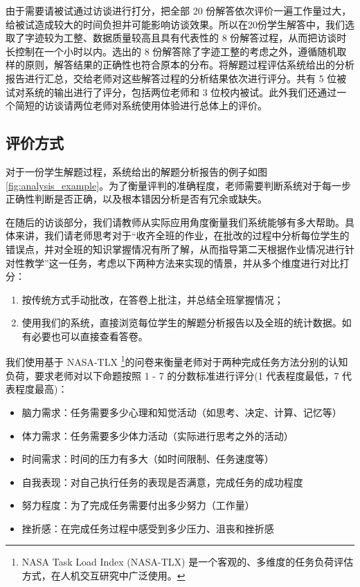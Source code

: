 由于需要请被试通过访谈进行打分，把全部 20 份解答依次评价一遍工作量过大，给被试造成较大的时间负担并可能影响访谈效果。所以在20份学生解答中，我们选取了字迹较为工整、数据质量较高且具有代表性的 8 份解答过程，从而把访谈时长控制在一个小时以内。选出的 8 份解答除了字迹工整的考虑之外，遵循随机取样的原则，解答结果的正确性也符合原本的分布。将解题过程评估系统给出的分析报告进行汇总，交给老师对这些解答过程的分析结果依次进行评分。共有 5 位被试对系统的输出进行了评分，包括两位老师和 3 位校内被试。此外我们还通过一个简短的访谈请两位老师对系统使用体验进行总体上的评价。

\subsection{评价方式}

对于一份学生解题过程，系统给出的解题分析报告的例子如图\ref{fig:analysis_example}。为了衡量评判的准确程度，老师需要判断系统对于每一步正确性判断是否正确，以及根本错因分析是否有冗余或缺失。

在随后的访谈部分，我们请教师从实际应用角度衡量我们系统能够有多大帮助。具体来讲，我们请老师思考对于“收齐全班的作业，在批改的过程中分析每位学生的错误点，并对全班的知识掌握情况有所了解，从而指导第二天根据作业情况进行针对性教学”这一任务，考虑以下两种方法来实现的情景，并从多个维度进行对比打分：

\begin{enumerate}
    \item 按传统方式手动批改，在答卷上批注，并总结全班掌握情况；
    \item 使用我们的系统，直接浏览每位学生的解题分析报告以及全班的统计数据。如有必要也可以直接查看答卷。
\end{enumerate}

我们使用基于 NASA-TLX \footnote{NASA Task Load Index (NASA-TLX) 是一个客观的、多维度的任务负荷评估方式，在人机交互研究中广泛使用。}的问卷来衡量老师对于两种完成任务方法分别的认知负荷，要求老师对以下命题按照 1 - 7 的分数标准进行评分(1 代表程度最低，7 代表程度最高)：

\begin{itemize}
    \item 脑力需求：任务需要多少心理和知觉活动（如思考、决定、计算、记忆等）
    \item 体力需求：任务需要多少体力活动（实际进行思考之外的活动）
    \item 时间需求：时间的压力有多大（如时间限制、任务速度等）
    \item 自我表现：对自己执行任务的表现是否满意，完成任务的成功程度
    \item 努力程度：为了完成任务需要付出多少努力（工作量）
    \item 挫折感：在完成任务过程中感受到多少压力、沮丧和挫折感
\end{itemize}

